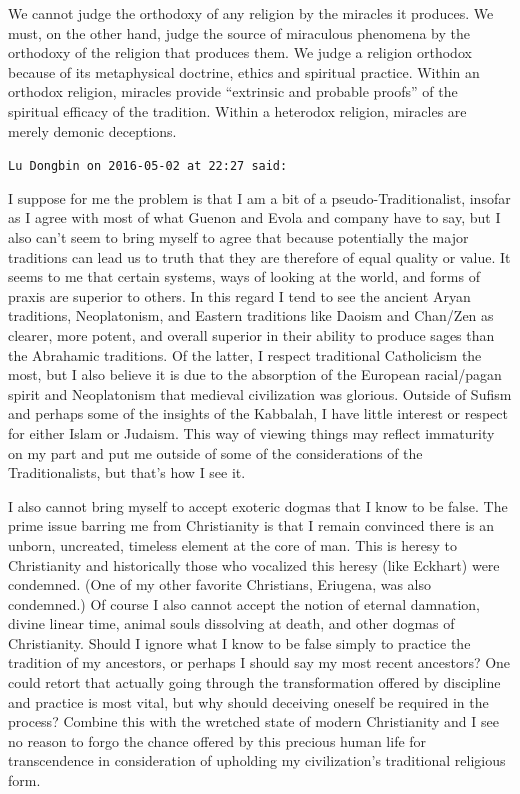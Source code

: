 \begin{footnotesize}
\begin{sffamily}
We cannot judge the orthodoxy of any religion by the miracles it produces. We must, on the other hand, judge the source of miraculous phenomena by the orthodoxy of the religion that produces them. We judge a religion orthodox because of its metaphysical doctrine, ethics and spiritual practice. Within an orthodox religion, miracles provide ``extrinsic and probable proofs'' of the spiritual efficacy of the tradition. Within a heterodox religion, miracles are merely demonic deceptions.

\hfill

\texttt{Lu Dongbin on 2016-05-02 at 22:27 said:}

I suppose for me the problem is that I am a bit of a pseudo-Traditionalist, insofar as I agree with most of what Guenon and Evola and company have to say, but I also can't seem to bring myself to agree that because potentially the major traditions can lead us to truth that they are therefore of equal quality or value. It seems to me that certain systems, ways of looking at the world, and forms of praxis are superior to others. In this regard I tend to see the ancient Aryan traditions, Neoplatonism, and Eastern traditions like Daoism and Chan/Zen as clearer, more potent, and overall superior in their ability to produce sages than the Abrahamic traditions. Of the latter, I respect traditional Catholicism the most, but I also believe it is due to the absorption of the European racial/pagan spirit and Neoplatonism that medieval civilization was glorious. Outside of Sufism and perhaps some of the insights of the Kabbalah, I have little interest or respect for either Islam or Judaism. This way of viewing things may reflect immaturity on my part and put me outside of some of the considerations of the Traditionalists, but that's how I see it.

I also cannot bring myself to accept exoteric dogmas that I know to be false. The prime issue barring me from Christianity is that I remain convinced there is an unborn, uncreated, timeless element at the core of man. This is heresy to Christianity and historically those who vocalized this heresy (like Eckhart) were condemned. (One of my other favorite Christians, Eriugena, was also condemned.) Of course I also cannot accept the notion of eternal damnation, divine linear time, animal souls dissolving at death, and other dogmas of Christianity. Should I ignore what I know to be false simply to practice the tradition of my ancestors, or perhaps I should say my most recent ancestors? One could retort that actually going through the transformation offered by discipline and practice is most vital, but why should deceiving oneself be required in the process? Combine this with the wretched state of modern Christianity and I see no reason to forgo the chance offered by this precious human life for transcendence in consideration of upholding my civilization's traditional religious form.


\end{sffamily}
\end{footnotesize}
